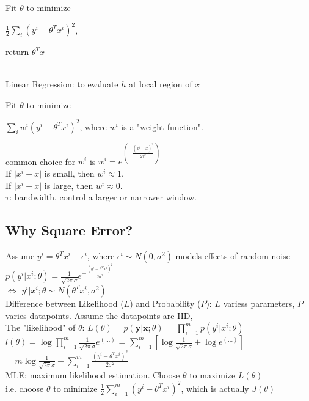 \documentclass{article}
\begin{document}
\noindent
Fit $\theta$ to minimize

$\frac{1}{2}\sum\limits_{i}(y^i-\theta^Tx^i)^2$, 

\noindent
return $\theta^Tx$


~\\
\noindent
Linear Regression: to evaluate $h$ at local region of $x$

\noindent
Fit $\theta$ to minimize

$\sum\limits_{i}w^i(y^i-\theta^Tx^i)^2$, 
where $w^i$ is a "weight function".

\noindent
common choice for $w^i$ is $w^i = e^{(-\frac{(x^i-x)^2}{2\tau^2})}$\\
If $\lvert x^i-x \rvert$ is small, then $w^i \approx 1$.\\
If $\lvert x^i-x \rvert$ is large, then $w^i \approx 0$.\\
$\tau$: bandwidth, control a larger or narrower window.\\

\subsection{Why Square Error?}

Assume $y^i = \theta^Tx^i + \epsilon^i$, where $\epsilon^i \sim  N(0, \sigma^2)$ models effects of random noise\\
$p(y^i|x^i;\theta) = \frac{1}{\sqrt{2\pi}\sigma}e^{-\frac{(y^i-\theta^Tx^i)^2}{2\sigma^2}}$\\
$\iff$ $y^i|x^i;\theta \sim N(\theta^Tx^i, \sigma^2)$\\

\noindent
Difference between Likelihood ($L$) and Probability ($P$): $L$ variess parameters, $P$ varies datapoints.
Assume the datapoints are IID,\\
The "likelihood" of $\theta$: $L(\theta) = p(\boldsymbol{y}|\boldsymbol{x};\theta)$
= $\prod\limits_{i=1}^m p(y^i|x^i;\theta)$\\
$l(\theta) = \log{\prod\limits_{i=1}^m\frac{1}{\sqrt{2\pi}\sigma}e^{(...)}}$
= $\sum\limits_{i=1}^m[\log{\frac{1}{\sqrt{2\pi}\sigma}} + \log{e^{(...)}}]$\\
= $m\log{\frac{1}{\sqrt{2\pi}\sigma}} - \sum\limits_{i=1}^m\frac{(y^i-\theta^Tx^i)^2}{2\sigma^2}$\\

\noindent
MLE: maximum likelihood estimation. Choose $\theta$ to maximize $L(\theta)$\\
i.e. choose $\theta$ to minimize $\frac{1}{2}\sum\limits_{i=1}^m(y^i-\theta^Tx^i)^2$, which is actually $J(\theta)$
\end{document}
